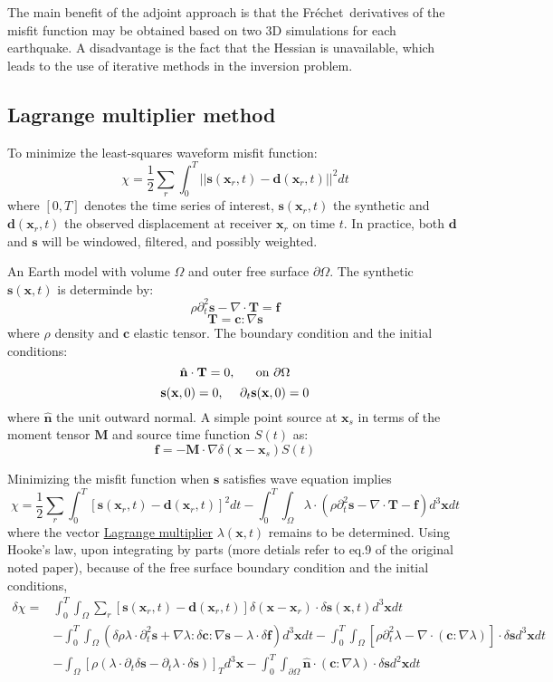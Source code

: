 \documentclass{article}
\newcommand{\mbf}[1]{\mathbf{#1}}
\newcommand{\myem}[1]{{\color{red}\uline{#1}}}
\newcommand{\myno}[1]{{\color{blue}#1}}
\newcommand{\Frechet}{Fr\'{e}chet~}
\begin{document}
The main benefit of the adjoint approach is that the \Frechet derivatives of the misfit function may be obtained based on two 3D simulations for each earthquake. A disadvantage is the fact that the Hessian is unavailable, which leads to the use of iterative methods in the inversion problem.\par
\subsection{Lagrange multiplier method}
To minimize the least-squares waveform misfit function:
\[ \chi=\frac{1}{2}\sum_r\int_0^T||\mbf s(\mbf x_r,t)-\mbf d(\mbf x_r,t)||^2dt \]
where $[0,T]$ denotes the time series of interest, $\mbf s(\mbf x_r,t)$ the synthetic and $\mbf d(\mbf x_r,t)$ the observed displacement at receiver $\mbf x_r$ on time $t$. In practice, both $\mbf d$ and $\mbf s$ will be windowed, filtered, and possibly weighted.\par
An Earth model with volume $\Omega$ and outer free surface $\partial\Omega$. The synthetic $\mbf s(\mbf x,t)$ is determinde by:
\[ \rho\partial_t^2\mbf s-\nabla\cdot\mbf T=\mbf f \]
\[ \mbf T=\mbf c:\nabla\mbf s \]
where $\rho$ density and $\mbf c$ elastic tensor. The boundary condition and the initial conditions:
\[ \hat{\mbf n}\cdot\mbf T=0 \text{,\hspace{5mm} on } \partial\Omega \]
\[ \mbf s(\mbf x,0)=0 \text{,\hspace{5mm}} \partial_t\mbf s(\mbf x,0)=0 \]
where $\hat{\mbf n}$ the unit outward normal. A simple point source at $\mbf x_s$ in terms of the moment tensor $\mbf M$ and source time function $S(t)$ as:
\[ \mbf f=-\mbf M\cdot\nabla\delta(\mbf x-\mbf x_s)S(t) \]\par
Minimizing the misfit function when $\mbf s$ satisfies wave equation implies
\[ \chi=\frac{1}{2}\sum_r\int_0^T[\mbf s(\mbf x_r,t)-\mbf d(\mbf x_r,t)]^2dt-\int_0^T\int_\Omega\lambda\cdot(\rho\partial_t^2\mbf s-\nabla\cdot\mbf T-\mbf f)d^3\mbf xdt \]
where the vector \myem{Lagrange multiplier} $\lambda(\mbf x,t)$ remains to be determined. Using Hooke's law, upon integrating by parts \myno{(more detials refer to eq.9 of the original noted paper)}, because of the free surface boundary condition and the initial conditions,
\begin{align*}
  \delta\chi= & \int_0^T\int_\Omega\sum_r[\mbf s(\mbf x_r,t)-\mbf d(\mbf x_r,t)]\delta(\mbf x-\mbf x_r)\cdot\delta\mbf s(\mbf x,t)d^3\mbf xdt \\
  & -\int_0^T\int_\Omega(\delta\rho\lambda\cdot\partial_t^2\mbf s+\nabla\lambda:\delta\mbf c:\nabla\mbf s-\lambda\cdot\delta\mbf f)d^3\mbf xdt-\int_0^T\int_\Omega[\rho\partial_t^2\lambda-\nabla\cdot(\mbf c:\nabla\lambda)]\cdot\delta\mbf sd^3\mbf xdt \\
  & -\int_\Omega[\rho(\lambda\cdot\partial_t\delta\mbf s-\partial_t\lambda\cdot\delta\mbf s)]_Td^3\mbf x-\int_0^T\int_{\partial\Omega}\hat{\mbf n}\cdot(\mbf c:\nabla\lambda)\cdot\delta\mbf sd^2\mbf xdt
\end{align*}
\end{document}
